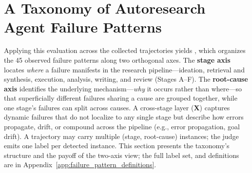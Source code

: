 \section{A Taxonomy of Autoresearch Agent Failure Patterns}
\label{sec:taxonomy}


Applying this evaluation across the collected trajectories yields \taxonomy, which organizes the 45 observed failure patterns along two orthogonal axes. The \textbf{stage axis} locates \emph{where} a failure manifests in the research pipeline---ideation, retrieval and synthesis, execution, analysis, writing, and review (Stages A--F). The \textbf{root-cause axis} identifies the underlying mechanism---\emph{why} it occurs rather than where---so that superficially different failures sharing a cause are grouped together, while one stage's failures can split across causes. A cross-stage layer (\textbf{X}) captures dynamic failures that do not localize to any single stage but describe how errors propagate, drift, or compound across the pipeline (e.g., error propagation, goal drift). A trajectory may carry multiple (stage, root-cause) instances; the judge emits one label per detected instance. This section presents the taxonomy's structure and the payoff of the two-axis view; the full label set, and definitions are in Appendix~\ref{app:failure_pattern_definitions}.



